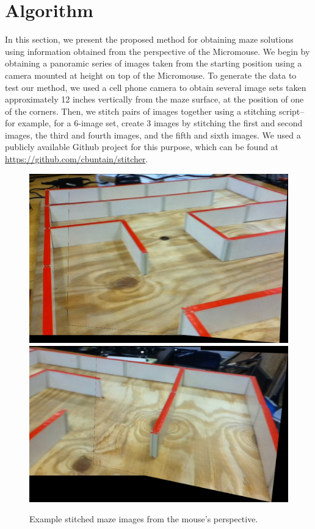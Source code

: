 \documentclass[10pt,twocolumn,letterpaper]{article}
\begin{document}
\section{Algorithm}
\label{sec:algorithm}
In this section, we present the proposed method for obtaining maze solutions using information obtained from the
perspective of the Micromouse.  We begin by obtaining a panoramic series of images taken from the starting position
using a camera mounted at height on top of the Micromouse.  To generate the data to test our method, we used a cell
phone camera to obtain several image sets taken approximately 12 inches vertically from the maze surface, at the
position of one of the corners.  Then, we stitch pairs of images together using a stitching script-- for example, for a
6-image set, create 3 images by stitching the first and second images, the third and fourth images, and the fifth and
sixth images.  We used a publicly available Github project for this purpose, which can be found at
\url{https://github.com/cbuntain/stitcher}.

\begin{figure}[t]
\begin{center}
	\includegraphics[width=0.8\linewidth]{../../src/imgs/one.jpg}
	\includegraphics[width=0.8\linewidth]{../../src/imgs/three.jpg}
\end{center}
\caption{Example stitched maze images from the mouse's perspective.}
\label{fig:stitched}
\end{figure}
\end{document}
